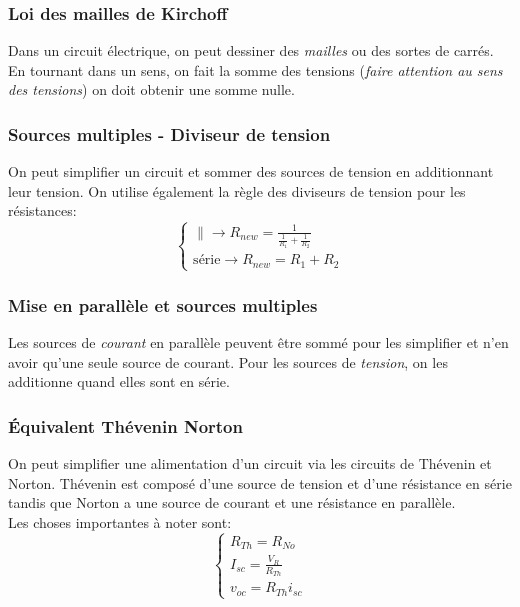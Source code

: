 \documentclass{report}
\begin{document}
\subsubsection{Loi des mailles de Kirchoff}
Dans un circuit électrique, on peut dessiner des \textit{mailles} ou des sortes de carrés. En tournant dans un sens, on fait la somme des tensions (\textit{faire attention au sens des tensions}) on doit obtenir une somme nulle.

\subsubsection{Sources multiples - Diviseur de tension}
On peut simplifier un circuit et sommer des sources de tension en additionnant leur tension. On utilise également la règle des diviseurs de tension pour les résistances:
\begin{equation}
\begin{cases}
\parallel \rightarrow R_{new} = \frac{1}{\frac{1}{R_1}+\frac{1}{R_2}}\\
\text{série} \rightarrow R_{new} = R_1 + R_2
\end{cases}
\end{equation}

\subsubsection{Mise en parallèle et sources multiples}
Les sources de \textit{courant} en parallèle peuvent être sommé pour les simplifier et n'en avoir qu'une seule source de courant. Pour les sources de \textit{tension}, on les additionne quand elles sont en série.

\subsubsection{Équivalent Thévenin Norton} \label{Th}
On peut simplifier une alimentation d'un circuit via les circuits de Thévenin et Norton. Thévenin est composé d'une source de tension et d'une résistance en série tandis que Norton a une source de courant et une résistance en parallèle.\\
Les choses importantes à noter sont:
\begin{equation}
\begin{cases}
R_{Th} = R_{No}\\
I_{sc} = \frac{V_{R}}{R_{Th}}\\
v_{oc} = R_{Th}i_{sc}
\end{cases}
\end{equation}
 
\end{document}
